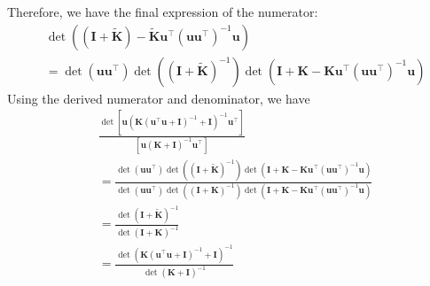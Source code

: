 Therefore, we have the final expression of the numerator:
\begin{align*}
    &\det \left( (\mathbf{I} + \widetilde{\mathbf{K}}) - \widetilde{\mathbf{K}}\mathbf{u}^\top (\mathbf{u} \mathbf{u}^\top)^{-1} \mathbf{u}\right) 
\\
    &= \det (\mathbf{u} \mathbf{u}^\top) \det \left((\mathbf{I}+\widetilde{\mathbf{K}})^{-1}\right) \det \left( \mathbf{I} + \mathbf{K} - \mathbf{K} \mathbf{u}^\top (\mathbf{u} \mathbf{u}^\top)^{-1}  \mathbf{u} \right)
\end{align*}
Using the derived numerator and denominator, we have 
\begin{align*}
    & \frac{\det [\mathbf{u}\left(\mathbf{K}(\mathbf{u}^\top\mathbf{u}+\mathbf{I})^{-1} + \mathbf{I}\right)^{-1}\mathbf{u}^\top]}{[\mathbf{u}\left(\mathbf{K} + \mathbf{I}\right)^{-1}\mathbf{u}^\top]} 
\\
    &= \frac{\det (\mathbf{u} \mathbf{u}^\top) \det \left((\mathbf{I}+\widetilde{\mathbf{K}})^{-1}\right) \det \left( \mathbf{I} + \mathbf{K} - \mathbf{K} \mathbf{u}^\top (\mathbf{u} \mathbf{u}^\top)^{-1}  \mathbf{u} \right)}{\det (\mathbf{u} \mathbf{u}^\top) \det \left((\mathbf{I}+\mathbf{K})^{-1}\right) \det \left(\mathbf{I} + \mathbf{K} - \mathbf{K}\mathbf{u}^\top (\mathbf{u} \mathbf{u}^\top)^{-1} \mathbf{u}\right)}
\\
    &=\frac{\det (\mathbf{I}+\widetilde{\mathbf{K}})^{-1}}{\det (\mathbf{I}+\mathbf{K})^{-1}} 
\\
    &=\frac{\det \left(\mathbf{K}(\mathbf{u}^\top\mathbf{u}+\mathbf{I})^{-1} + \mathbf{I}\right)^{-1}}{\det \left(\mathbf{K} + \mathbf{I}\right)^{-1}}   
    \end{align*} 
